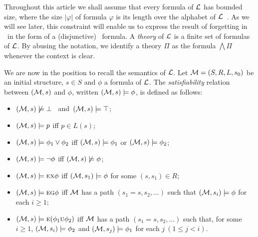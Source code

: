 \documentclass{article}
\begin{document}


Throughout this article we shall assume that every formula of $\cal L$ has bounded size, where
the size $|\varphi|$ of formula $\varphi$ is its length over the alphabet of $\cal L$~\cite{DBLP:journals/jcss/EmersonH85}.
As we will see later, this constraint will enable us to express the result of forgetting in \CTL\  in the form of a (disjunctive) \CTL\ formula. A  {\em theory} of $\cal L$ is a finite set of formulas of $\cal L$. By abusing the notation, we identify a theory $\Pi$ as the formula $\bigwedge\Pi$ whenever the context is clear.

We are now in the position to recall the semantics of $\cal L$.
Let ${\cal M}=(S,R,L,s_0)$ be an initial structure, $s\in S$ and $\phi$ a formula of $\cal L$.
The {\em satisfiability} relation between $({\cal M},s)$ and $\phi$,
written $({\cal M},s)\models\phi$, is %
defined
as follows:

\begin{itemize}
  \item $({\cal M},s)\not\models\bot$ \ and\  $({\cal M},s)\models\top$;
  \item $({\cal M},s)\models p$ iff $p\in L(s)$;
  \item $({\cal M},s)\models \phi_1\lor\phi_2$ iff
    $({\cal M},s)\models \phi_1$ or $({\cal M},s)\models \phi_2$;
  \item $({\cal M},s)\models \neg\phi$ iff  $({\cal M},s)\not\models\phi$;
  \item $({\cal M},s)\models \textsc{e}\textsc{x}\phi$ iff
    $({\cal M},s_1)\models\phi$ for some $(s,s_1)\in R$;
  \item $({\cal M},s)\models \textsc{e}\textsc{g}\phi$ iff
    $\cal M$ has a path $(s_1=s,s_2,\ldots)$ such that
    $({\cal M},s_i)\models\phi$ for each $i\ge 1$;
  \item $({\cal M},s)\models \textsc{e}(\phi_1\textsc{u}\phi_2)$ iff
    $\cal M$ has a path $(s_1=s,s_2,\ldots)$ such that, for some $i\ge 1$,
    $({\cal M},s_i)\models\phi_2$ and
    $({\cal M},s_j)\models\phi_1$ for each $j~(1\leq j<i)$.
\end{itemize}
\end{document}
